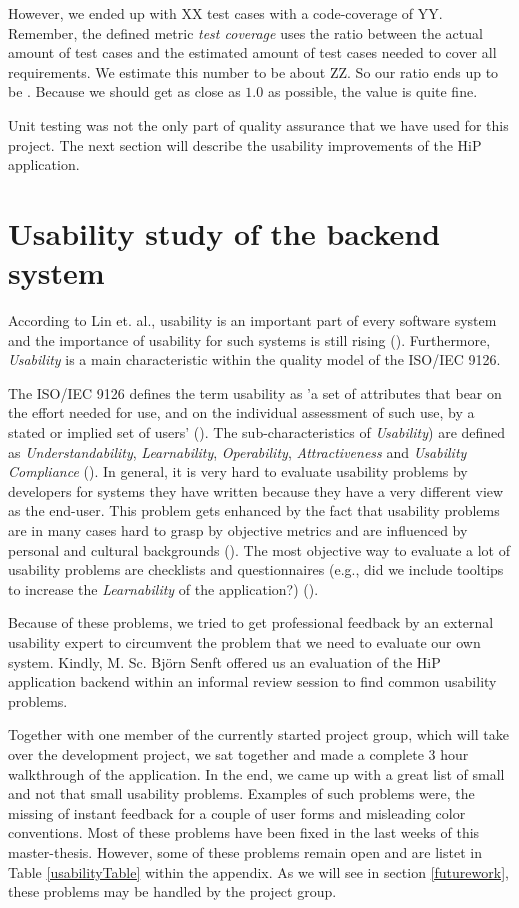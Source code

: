 However, we ended up with XX test cases with a code-coverage of YY. Remember, the defined metric \emph{test coverage} uses the ratio between the actual amount of test cases and the estimated amount of test cases needed to cover all requirements. We estimate this number to be about ZZ. So our ratio ends up to be . Because we should get as close as $1.0$ as possible, the value is quite fine.

Unit testing was not the only part of quality assurance that we have used for this project. The next section will describe the usability improvements of the \ac{HiP} application.

\section{Usability study of the backend system}
According to Lin et. al., usability is an important part of every software system and the importance of usability for such systems is still rising (\cite{lin1997proposed}). Furthermore, \emph{Usability} is a main characteristic within the quality model of the ISO/IEC 9126.

The ISO/IEC 9126 defines the term usability as 'a set of attributes that bear on the effort needed for use, and on the individual assessment of such use, by a stated or implied set of users' (\cite{bevan1997quality}). The sub-characteristics of \emph{Usability}) are defined as \emph{Understandability}, \emph{Learnability}, \emph{Operability}, \emph{Attractiveness} and \emph{Usability Compliance} (\cite{bevan1997quality}). In general, it is very hard to evaluate usability problems by developers for systems they have written because they have a very different view as the end-user. This problem gets enhanced by the fact that usability problems are in many cases hard to grasp by objective metrics and are influenced by personal and cultural backgrounds (\cite{herman1996towards}). The most objective way to evaluate a lot of usability problems are checklists and questionnaires (e.g., did we include tooltips to increase the \emph{Learnability} of the application?) (\cite{herman1996towards}). 

Because of these problems, we tried to get professional feedback by an external usability expert to circumvent the problem that we need to evaluate our own system. Kindly, M. Sc. Bj\"orn Senft offered us an evaluation of the \ac{HiP} application backend within an informal review session to find common usability problems. 

Together with one member of the currently started project group, which will take over the development project, we sat together and made a complete 3 hour walkthrough of the application. In the end, we came up with a great list of small and not that small usability problems. Examples of such problems were, the missing of instant feedback for a couple of user forms and misleading color conventions. Most of these problems have been fixed in the last weeks of this master-thesis. However, some of these problems remain open and are listet in Table \ref{usabilityTable} within the appendix. As we will see in section \ref{futurework}, these problems may be handled by the project group.

